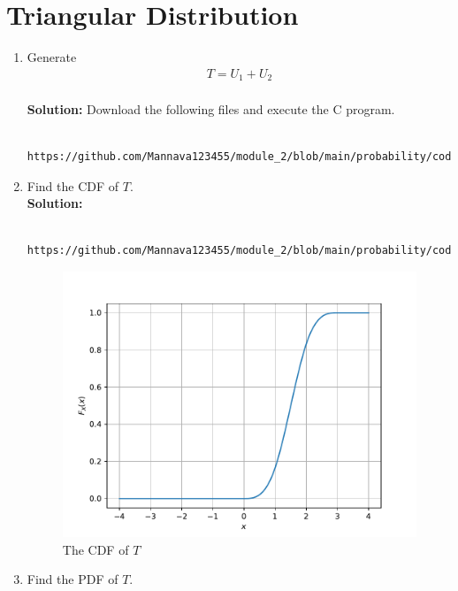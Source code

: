 \documentclass[journal,10pt,twocolumn]{IEEEtran}
\newcommand{\solution}{\noindent \textbf{Solution: }}
\begin{document}
\section{Triangular Distribution}
%
\begin{enumerate}
\item Generate 
	\begin{align}
		T = U_1+U_2
	\end{align}\\
\solution Download the following files and execute the  C program.
\begin{lstlisting}
	https://github.com/Mannava123455/module_2/blob/main/probability/codes/chapter_2/triangle.c
\end{lstlisting}
\item Find the CDF of $T$.\\
\solution 
\begin{lstlisting}
	https://github.com/Mannava123455/module_2/blob/main/probability/codes/chapter_2/2.4.5_cdf.py
\end{lstlisting}
\begin{figure}[H]
\centering
\includegraphics[width=\columnwidth]{triangle_cdf.pdf}
\caption{The CDF of $T$}
\label{fig:tri_cdf}
\end{figure}
\item Find the PDF of $T$.\\


\end{enumerate}
\end{document}
